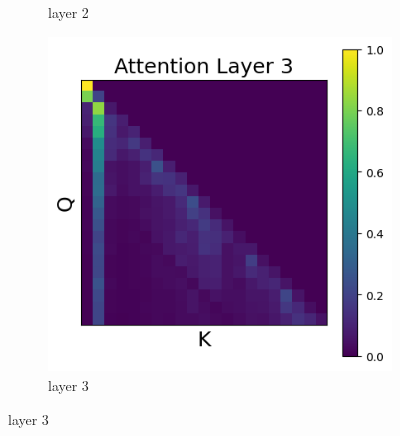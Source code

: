 \documentclass[11pt]{article}
\begin{document}
\begin{figure}[t]
\begin{subfigure}[t]{0.24\textwidth}
    \caption{layer 2}
  \end{subfigure}\hfill
  \begin{subfigure}[t]{0.24\textwidth}
    \centering
    \includegraphics[width=1.4\columnwidth]{figures/intervention3/layer_3.png}
    \caption{layer 3}
  \end{subfigure}\hfill


\end{figure}
\end{document}
